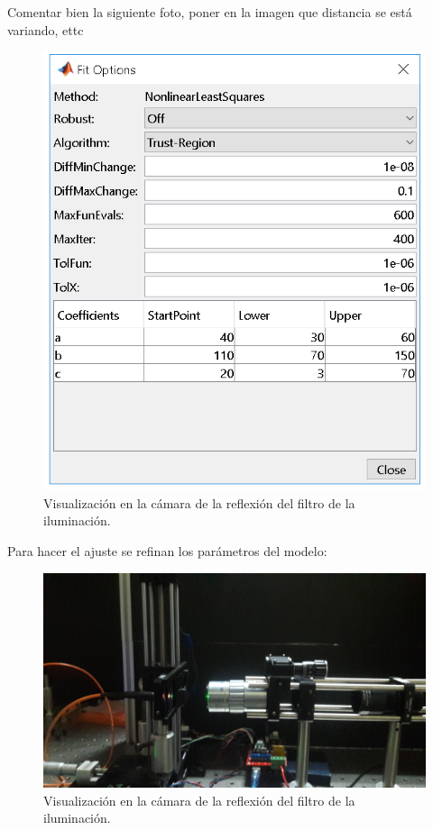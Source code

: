 Comentar bien la siguiente foto, poner en la imagen que distancia se está variando, ettc
\begin{figure}[H]
	\centering
	\includegraphics[scale=0.4]{Figs/microespectrometro/refinacionparam.png}
	\caption{Visualización en la cámara de la reflexión del filtro de la iluminación.}
	\label{fig:bgcel}
\end{figure}


Para hacer el ajuste se refinan los parámetros del modelo:

\begin{figure}[H]
	\centering
	\includegraphics[scale=0.1]{Figs/microespectrometro/sm1zcambio.jpg}
	\caption{Visualización en la cámara de la reflexión del filtro de la iluminación.}
	\label{fig:bgcel}
\end{figure}



